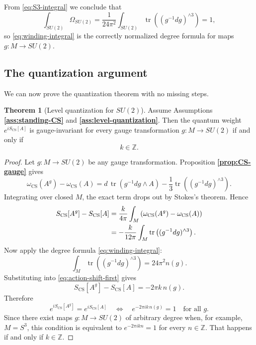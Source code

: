 \documentclass[11pt]{article}
\newcommand{\Z}{\mathbb{Z}}
\newcommand{\tr}{\operatorname{tr}}
\newcommand{\CS}{\operatorname{CS}}
\theoremstyle{definition}
\newtheorem{theorem}[equation]{Theorem}
\numberwithin{theorem}{section}
\numberwithin{equation}{section}
\begin{document}
\noindent From \eqref{eq:S3-integral} we conclude that
\begin{equation*}
\int_{SU(2)} \Omega_{SU(2)} = \frac{1}{24\pi^2}\int_{SU(2)}\tr\left((g^{-1}dg)^{\wedge 3}\right) = 1,
\end{equation*}
so \eqref{eq:winding-integral} is the correctly normalized degree formula for maps $g:M\to SU(2)$.

\subsection{The quantization argument}

We can now prove the quantization theorem with no missing steps.

\begin{theorem}[Level quantization for $SU(2)$]\label{thm:level-quantization-su2}
Assume Assumptions \textbf{\ref{ass:standing-CS}} and \textbf{\ref{ass:level-quantization}}. Then the quantum weight $e^{iS_{\CS}[A]}$ is gauge-invariant for every gauge transformation $g:M\to SU(2)$ if and only if
\begin{equation}\label{eq:level-quant}
k\in \Z.
\end{equation}
\end{theorem}

\begin{proof}
Let $g:M\to SU(2)$ be any gauge transformation. Proposition \textbf{\ref{prop:CS-gauge}} gives
\begin{equation*}
\omega_{\CS}(A^g) - \omega_{\CS}(A)
=
d\,\tr(g^{-1}dg\wedge A) - \frac{1}{3}\tr\left((g^{-1}dg)^{\wedge 3}\right).
\end{equation*}
Integrating over closed $M$, the exact term drops out by Stokes's theorem. Hence
\begin{align}
S_{\CS}[A^g] - S_{\CS}[A]
&=
\frac{k}{4\pi}\int_M\left(\omega_{\CS}(A^g) - \omega_{\CS}(A)\right) \notag\\
&=
-\frac{k}{12\pi}\int_M \tr\left((g^{-1}dg)^{\wedge 3}\right).
\label{eq:action-shift-first}
\end{align}
Now apply the degree formula \eqref{eq:winding-integral}:
\begin{equation*}
\int_M \tr\left((g^{-1}dg)^{\wedge 3}\right) = 24\pi^2 n(g).
\end{equation*}
Substituting into \eqref{eq:action-shift-first} gives
\begin{equation}\label{eq:S-shift}
S_{\CS}[A^g] - S_{\CS}[A] = -2\pi k\, n(g).
\end{equation}
Therefore
\begin{equation*}
e^{iS_{\CS}[A^g]} = e^{iS_{\CS}[A]}
\quad\Longleftrightarrow\quad
e^{-2\pi i k\, n(g)} = 1
\quad\text{for all } g.
\end{equation*}
Since there exist maps $g:M\to SU(2)$ of arbitrary degree when, for example, $M=S^3$, this condition is equivalent to $e^{-2\pi i k n}=1$ for every $n\in\Z$. That happens if and only if $k\in\Z$.
\end{proof}
\end{document}
